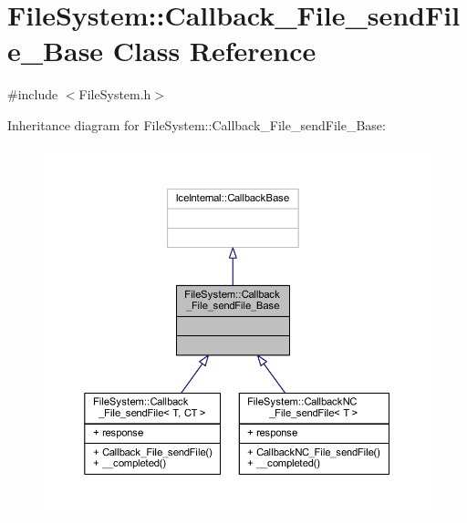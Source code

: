 \hypertarget{class_file_system_1_1_callback___file__send_file___base}{}\section{File\+System\+:\+:Callback\+\_\+\+File\+\_\+send\+File\+\_\+\+Base Class Reference}
\label{class_file_system_1_1_callback___file__send_file___base}


{\ttfamily \#include $<$File\+System.\+h$>$}



Inheritance diagram for File\+System\+:\+:Callback\+\_\+\+File\+\_\+send\+File\+\_\+\+Base\+:
\nopagebreak
\begin{figure}[H]
\begin{center}
\leavevmode
\includegraphics[width=350pt]{class_file_system_1_1_callback___file__send_file___base__inherit__graph}
\end{center}
\end{figure}


